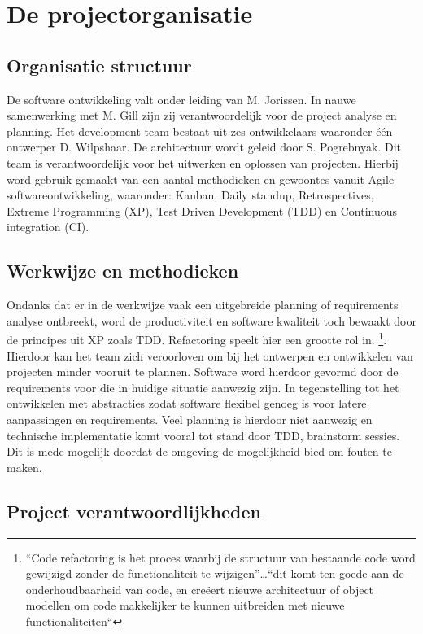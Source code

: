 \section{De projectorganisatie} %

    \subsection{Organisatie structuur}

    De software ontwikkeling valt onder leiding van M. Jorissen. In nauwe samenwerking met M. Gill zijn zij verantwoordelijk voor de project analyse en planning. Het development team bestaat uit zes ontwikkelaars waaronder één ontwerper D. Wilpshaar.
    De architectuur wordt geleid door S. Pogrebnyak. Dit team is verantwoordelijk voor het uitwerken en oplossen van projecten. Hierbij word gebruik gemaakt van een aantal methodieken en gewoontes vanuit Agile-softwareontwikkeling, waaronder: Kanban, Daily standup, Retrospectives, Extreme Programming (XP), Test Driven Development (TDD) en Continuous integration (CI).

    \subsection{Werkwijze en methodieken}

    Ondanks dat er in de werkwijze vaak een uitgebreide planning of requirements analyse ontbreekt, word de productiviteit en software kwaliteit toch bewaakt door de principes uit XP zoals TDD. Refactoring speelt hier een grootte rol in.\parencite{refactoring-ruby}
    \footnote{“Code refactoring is het proces waarbij de structuur van bestaande code word gewijzigd zonder de functionaliteit te wijzigen”…“dit komt ten goede aan de onderhoudbaarheid van code, en creëert nieuwe architectuur of object modellen om code makkelijker te kunnen uitbreiden met nieuwe functionaliteiten“}.
    Hierdoor kan het team zich veroorloven om bij het ontwerpen en ontwikkelen van projecten minder vooruit te plannen. Software word hierdoor gevormd door de requirements voor die in huidige situatie aanwezig zijn. In tegenstelling tot het ontwikkelen met abstracties zodat software flexibel genoeg is voor latere aanpassingen en requirements. Veel planning is hierdoor niet aanwezig en technische implementatie komt vooral tot stand door TDD, brainstorm sessies. Dit is mede mogelijk doordat de omgeving de mogelijkheid bied om fouten te maken.

    \subsection{Project verantwoordlijkheden}

